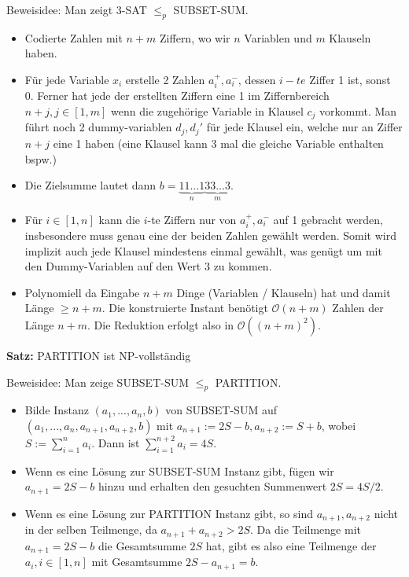 \documentclass[a4paper,graphics,11pt]{article}
\begin{document}
Beweisidee: Man zeigt 3-SAT $\leq_p$ SUBSET-SUM.
\begin{itemize}
    \item Codierte Zahlen mit $n+m$ Ziffern, wo wir $n$ Variablen und $m$ Klauseln haben.
    \item Für jede Variable $x_i$ erstelle 2 Zahlen $a_i^+, a_i^-$, dessen $i-te$ Ziffer
        1 ist, sonst 0. Ferner hat jede der erstellten Ziffern eine 1 im Ziffernbereich $n+j, j \in [1,m]$
        wenn die zugehörige Variable in Klausel $c_j$ vorkommt. Man führt noch 2 dummy-variablen $d_j,d_j'$
        für jede Klausel ein, welche nur an Ziffer $n+j$ eine 1 haben (eine Klausel kann 3 mal die gleiche Variable enthalten bspw.)
    \item Die Zielsumme lautet dann $b = \underbrace{11...1}_{n}\underbrace{33...3}_{m}$.
    \item Für $i \in [1,n]$ kann die $i$-te Ziffern nur von $a_i^+,a_i^-$ auf 1 gebracht werden,
        insbesondere muss genau eine der beiden Zahlen gewählt werden. Somit wird implizit auch
        jede Klausel mindestens einmal gewählt, was genügt um mit den Dummy-Variablen auf den Wert 3 zu kommen.
    \item Polynomiell da Eingabe $n+m$ Dinge (Variablen / Klauseln) hat und damit Länge $\geq n+m$.
        Die konstruierte Instant benötigt $\mathcal{O}(n+m)$ Zahlen der Länge $n+m$. Die Reduktion erfolgt
        also in $\mathcal{O}((n+m)^2)$.
\end{itemize}

\newpage

\textbf{Satz:} PARTITION ist \textsf{NP}-vollständig

Beweisidee: Man zeige SUBSET-SUM $\leq_p$ PARTITION.
\begin{itemize}
    \item Bilde Instanz $(a_1,...,a_n,b)$ von SUBSET-SUM auf $(a_1,...,a_n,a_{n+1},a_{n+2},b)$ mit
        $a_{n+1} := 2S - b, a_{n+2} := S + b$, wobei $S := \sum_{i=1}^{n} a_i$.
        Dann ist $\sum_{i=1}^{n+2} a_i = 4S$.
    \item Wenn es eine Lösung zur SUBSET-SUM Instanz gibt, fügen wir $a_{n+1} = 2S-b$ hinzu
        und erhalten den gesuchten Summenwert $2S = 4S/2$.
    \item Wenn es eine Lösung zur PARTITION Instanz gibt, so sind $a_{n+1},a_{n+2}$ nicht in der
        selben Teilmenge, da $a_{n+1}+a_{n+2} > 2S$. Da die Teilmenge mit $a_{n+1} = 2S-b$
        die Gesamtsumme $2S$ hat, gibt es also eine Teilmenge der $a_i, i\in [1,n]$ mit Gesamtsumme
        $2S - a_{n+1} = b$.
\end{itemize}
\end{document}
